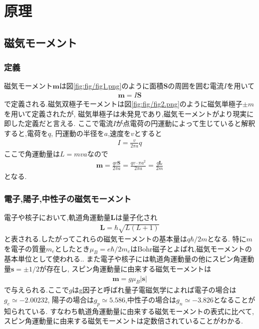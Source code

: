 \section{原理}
\subsection{磁気モーメント}
\subsubsection{定義}
磁気モーメント$\bm m$は図\ref{fig:fig/fig1.png}のように面積$\bm S$の周囲を囲む電流$I$を用いて
\begin{align}
  {\bm m}=I{\bm S}
\end{align}
で定義される.磁気双極子モーメントは図\ref{fig:fig/fig2.png}のように磁気単極子$\pm m$を用いて定義されたが,
磁気単極子は未発見であり,磁気モーメントがより現実に即した定義だと言える.
ここで電流$I$が点電荷の円運動によって生じていると解釈すると,電荷を$q$,
円運動の半径を$a$,速度を$v$とすると
\begin{align}
  I=\frac{v}{2\pi a}q
\end{align}
ここで角運動量は$L=mva$なので
\begin{align}
  {\bm m}=\frac{qv{\bm S}}{2\pi a}=\frac{qv\cdot\pi a^2}{2\pi a}=\frac{q{\bm L}}{2m}
\end{align}
となる.
\begin{figure}[htbp]
  \begin{minipage}{0.5\hsize}
  \end{minipage}
  \begin{minipage}{0.5\hsize}
  \end{minipage}
\end{figure}
\subsubsection{電子,陽子,中性子の磁気モーメント}
電子や核子において,軌道角運動量$\bm L$は量子化され
\begin{align}
  {\bm L}=\hbar\sqrt{L(L+1)}
\end{align}
と表される.したがってこれらの磁気モーメントの基本量は$q\hbar/2m$となる.
特に$m$を電子の質量$m_e$としたとき$\mu_B=e\hbar/2m_e$はBohr磁子とよばれ,磁気モーメントの基本単位として使われる..
また電子や核子には軌道角運動量の他にスピン角運動量${\bm s}=\pm1/2$が存在し,
スピン角運動量に由来する磁気モーメントは
\begin{align}
  {\bm m}=g\mu_B|{\bm s}|
\end{align}
で与えられる.ここで$g$はg因子と呼ばれ量子電磁気学によれば電子の場合は$g_e\simeq-2.00232$,
陽子の場合は$g_p\simeq5.586$,中性子の場合は$g_n\simeq-3.826$となることが知られている.
すなわち軌道角運動量に由来する磁気モーメントの表式に比べて,
スピン角運動量に由来する磁気モーメントは定数倍されていることがわかる.

